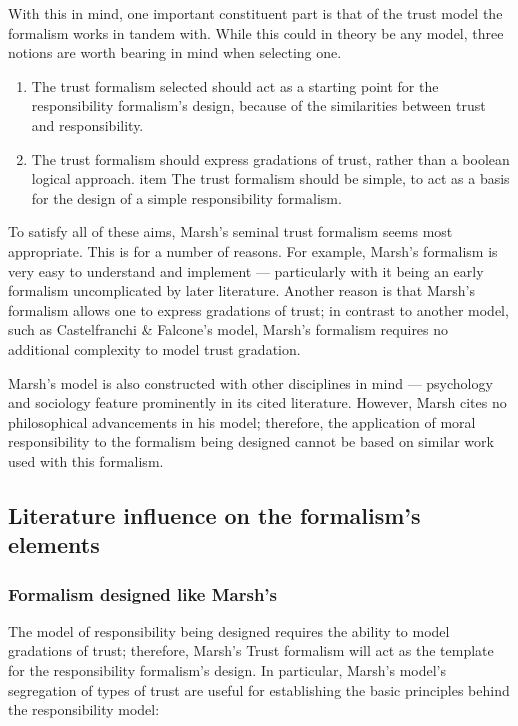 With this in mind, one important constituent part is that of the trust model the formalism works in tandem with. While this could in theory be any model, three notions are worth bearing in mind when selecting one.
\begin{enumerate}
    \item The trust formalism selected should act as a starting point for the responsibility formalism's design, because of the similarities between trust and responsibility.
    \item The trust formalism should express gradations of trust, rather than a boolean logical approach. item The trust formalism should be simple, to act as a basis for the design of a simple responsibility formalism.
\end{enumerate}

To satisfy all of these aims, Marsh's seminal trust formalism seems most appropriate. This is for a number of reasons. For example, Marsh's formalism is very easy to understand and implement --- particularly with it being an early formalism uncomplicated by later literature. Another reason is that Marsh's formalism allows one to express gradations of trust; in contrast to another model, such as Castelfranchi \& Falcone's model, Marsh's formalism requires no additional complexity to model trust gradation.\par

Marsh's model is also constructed with other disciplines in mind --- psychology and sociology feature prominently in its cited literature. However, Marsh cites no philosophical advancements in his model; therefore, the application of moral responsibility to the formalism being designed cannot be based on similar work used with this formalism.\par

\subsection{Literature influence on the formalism's elements}
\subsubsection{Formalism designed like Marsh's}
The model of responsibility being designed requires the ability to model gradations of trust; therefore, Marsh's Trust formalism will act as the template for the responsibility formalism's design. In particular, Marsh's model's segregation of types of trust are useful for establishing the basic principles behind the responsibility model:

